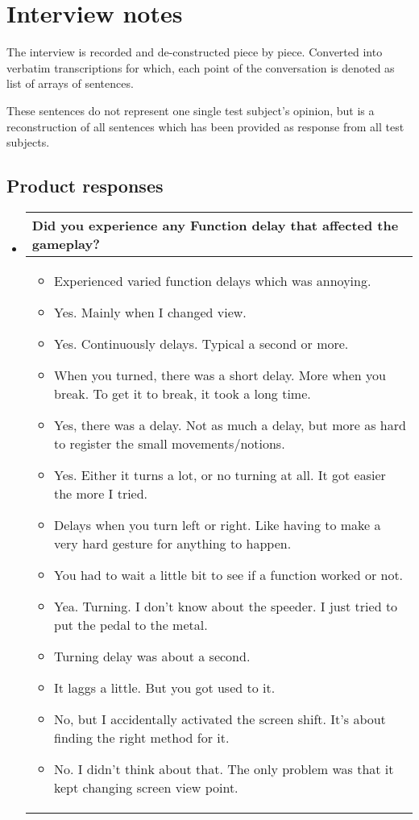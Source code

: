 \section{Interview notes} \label{app:interview}
The interview is recorded and de-constructed piece by piece. Converted into verbatim transcriptions for which, each point of the conversation is denoted as list of arrays of sentences.

These sentences do not represent one single test subject's opinion, but is a reconstruction of all sentences which has been provided as response from all test subjects.

\subsection{Product responses}
\begin{itemize}
\item[]
\begin{table}[!htb]
\centering
\begin{tabular}{| p{5.5in} |}
\hline
	\cellcolor{NotSkyBlue}\textbf{Did you experience any Function delay that affected the gameplay?}
	\\
	\hline
	\begin{itemize}
        \item Experienced varied function delays which was annoying.
        \item Yes. Mainly when  I changed view.
        \item Yes. Continuously delays. Typical a second or more.
        \item When you turned, there was a short delay. More when you break. To get it to break, it took a long time.
        \item Yes, there was a delay. Not as much a delay, but more as hard to register the small movements/notions.
        \item Yes. Either it turns a lot, or no turning at all. It got easier the more I tried.
        \item Delays when you turn left or right. Like having to make a very hard gesture for anything to happen.       
        \item You had to wait a little bit to see if a function worked or not.
        \item Yea. Turning. I don’t know about the speeder. I just tried to put the pedal to the metal.
        \item Turning delay was about a second.
        \item It laggs a little. But you got used to it.
        \item No, but I accidentally activated the screen shift. It’s about finding the right method for it.
        \item No. I didn’t think about that. The only problem was that it kept changing screen view point.
	\end{itemize}
	\\
	\hline
\end{tabular}
\end{table}


\end{itemize}
